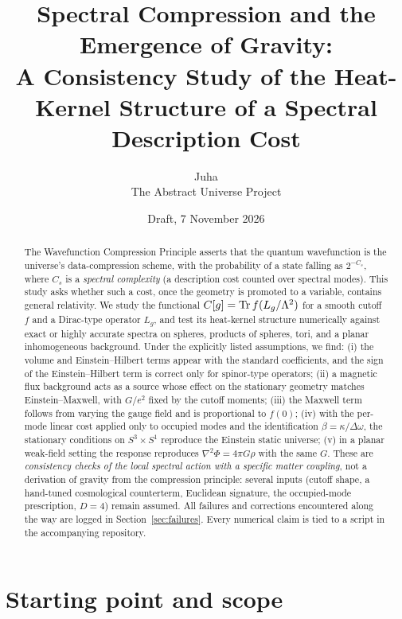 \documentclass[11pt]{article}
\title{Spectral Compression and the Emergence of Gravity:\\
A Consistency Study of the Heat-Kernel Structure of a Spectral Description Cost}
\author{Juha\\[2pt]\small The Abstract Universe Project}
\date{Draft, 7 November 2026}
\begin{document}
\maketitle




\begin{abstract}
The Wavefunction Compression Principle asserts that the quantum wavefunction is the
universe's data-compression scheme, with the probability of a state falling as $2^{-C_s}$,
where $C_s$ is a \emph{spectral complexity} (a description cost counted over spectral modes).
This study asks whether such a cost, once the geometry is promoted to a variable, contains
general relativity. We study the functional $C[g]=\Tr f(L_g/\Lambda^2)$ for a smooth cutoff
$f$ and a Dirac-type operator $L_g$, and test its heat-kernel structure numerically against
exact or highly accurate spectra on spheres, products of spheres, tori, and a planar
inhomogeneous background. Under the explicitly listed assumptions, we find: (i) the volume and
Einstein--Hilbert terms appear with the standard coefficients, and the sign of the
Einstein--Hilbert term is correct only for spinor-type operators; (ii) a magnetic flux
background acts as a source whose effect on the stationary geometry matches Einstein--Maxwell,
with $G/e^2$ fixed by the cutoff moments; (iii) the Maxwell term follows from varying the gauge
field and is proportional to $f(0)$; (iv) with the per-mode linear cost applied only to occupied modes and
the identification $\beta=\kappa/\Delta\omega$, the stationary conditions on $S^3\times S^1$ reproduce
the Einstein static universe; (v) in a planar weak-field setting the response reproduces
$\nabla^2\Phi=4\pi G\rho$ with the same $G$. These are \emph{consistency checks of the local
spectral action with a specific matter coupling}, not a derivation of gravity from the
compression principle: several inputs (cutoff shape, a hand-tuned cosmological counterterm,
Euclidean signature, the occupied-mode prescription, $D=4$) remain assumed. All failures and
corrections encountered along the way are logged in Section~\ref{sec:failures}.
Every numerical claim is tied to a script in the accompanying repository.
\end{abstract}



\section{Starting point and scope}\label{sec:start}
\end{document}

